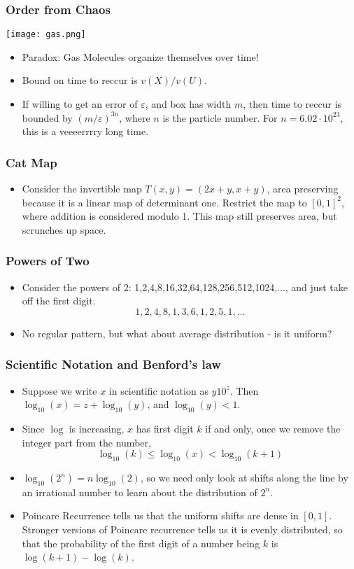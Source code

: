 \documentclass{beamer}
\begin{document}
\begin{frame}
\frametitle{Order from Chaos}
\begin{center} \texttt{[image: gas.png]} \end{center}
\begin{itemize}
    \item<1-> Paradox: Gas Molecules organize themselves over time!
    \item<2-> Bound on time to reccur is $v(X)/v(U)$.
    \item<3-> If willing to get an error of $\varepsilon$, and box has width $m$, then time to reccur is bounded by $(m/\varepsilon)^{3n}$, where $n$ is the particle number. For $n = 6.02 \cdot 10^{23}$, this is a veeeerrrry long time.\\
\end{itemize}
\end{frame}

\begin{frame}
\frametitle{Cat Map}
\begin{itemize}
    \item<1-> Consider the invertible map $T(x,y) = (2x + y, x + y)$, area preserving because it is a linear map of determinant one. Restrict the map to $[0,1]^2$, where addition is considered modulo 1. This map still preserves area, but scrunches up space.
\end{itemize}
\end{frame}

\begin{frame}
\frametitle{Powers of Two}
\begin{itemize}
    \item<1-> Consider the powers of 2: 1,2,4,8,16,32,64,128,256,512,1024,$\dots$, and just take off the first digit.
    \[ 1,2,4,8,1,3,6,1,2,5,1,\dots \]
    \item<2-> No regular pattern, but what about average distribution - is it uniform?
\end{itemize}
\end{frame}

\begin{frame}
\frametitle{Scientific Notation and Benford's law}
\begin{itemize}
    \item<1-> Suppose we write $x$ in scientific notation as $y 10^z$. Then $\log_{10}(x) = z + \log_{10}(y)$, and $\log_{10}(y) < 1$.
    \item<2-> Since $\log$ is increasing, $x$ has first digit $k$ if and only, once we remove the integer part from the number,
    \[ \log_{10}(k) \leq \log_{10}(x) < \log_{10}(k+1) \]
    \item<3-> $\log_{10}(2^n) = n \log_{10}(2)$, so we need only look at shifts along the line by an irrational number to learn about the distribution of $2^n$.
    \item<4-> Poincare Recurrence tells us that the uniform shifts are dense in $[0,1]$. Stronger versions of Poincare recurrence tells us it is evenly distributed, so that the probability of the first digit of a number being $k$ is $\log(k+1) - \log(k)$.
\end{itemize}
\end{frame}
\end{document}
